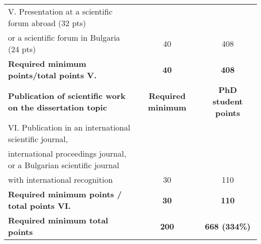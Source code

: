 \begin{table}[!htp]
{\begin{tabular}{lcc}
		V. Presentation at a scientific forum abroad (32 pts)\\or a scientific forum in Bulgaria (24 pts)                                                            & 40                                            & 408                                             \\ \hline
		\textbf{Required minimum points/total points V.}                                                                                                          & \textbf{40}                                   & \textbf{408}                                    \\ \hline
		\textbf{Publication of scientific work on the dissertation topic}                                                                                           & \textbf{Required minimum}                     & \textbf{PhD student points}                     \\ \hline
		VI. Publication in an international scientific journal,\\ international proceedings journal, or a Bulgarian scientific journal\\with international recognition & 30                                            & 110                                             \\ \hline
		\textbf{Required minimum points / total points VI.}                                                                                                         & \textbf{30}                                   & \textbf{110}                                    \\ \hline
		\textbf{Required minimum total points}                                                                                                                      & \textbf{200}                                  & \textbf{668 (334\%)}                             \\ \hline
	\end{tabular}%
}
\end{table}